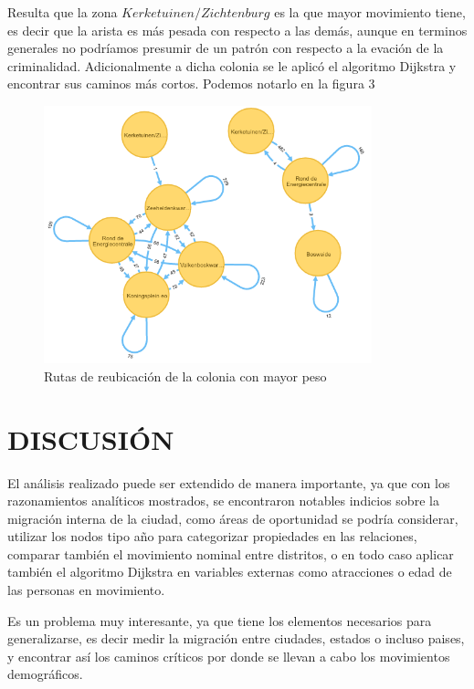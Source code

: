 \documentclass[letterpaper, 10 pt, conference]{ieeeconf}  %
\begin{document}


Resulta que la zona $Kerketuinen/Zichtenburg$ es la que mayor movimiento tiene, es decir que la arista es m\'as pesada con respecto a las dem\'as, aunque en terminos generales no podr\'iamos presumir de un patr\'on con respecto a la evaci\'on de la criminalidad. Adicionalmente a dicha colonia se le aplic\'o el algoritmo Dijkstra y encontrar sus caminos m\'as cortos. Podemos notarlo en la figura 3

\begin{figure}[h]
\includegraphics[width=9.5cm]{dijkstra.png}
\caption{Rutas de reubicaci\'on de la colonia con mayor peso}
\end{figure}

\section{DISCUSI\'ON}
\vspace{2mm}
El an\'alisis realizado puede ser extendido de manera importante, ya que con los razonamientos anal\'iticos mostrados, se encontraron notables indicios sobre la migraci\'on interna de la ciudad, como \'areas de oportunidad se podr\'ia considerar, utilizar los nodos tipo a\~no para categorizar propiedades en las relaciones, comparar tambi\'en el movimiento nominal entre distritos, o en todo caso aplicar tambi\'en el algoritmo Dijkstra en variables externas como atracciones o edad de las personas en movimiento.

Es un problema muy interesante, ya que tiene los elementos necesarios para generalizarse, es decir medir la migraci\'on entre ciudades, estados o incluso paises, y encontrar as\'i los caminos cr\'iticos por donde se llevan a cabo los movimientos demogr\'aficos.
\end{document}

